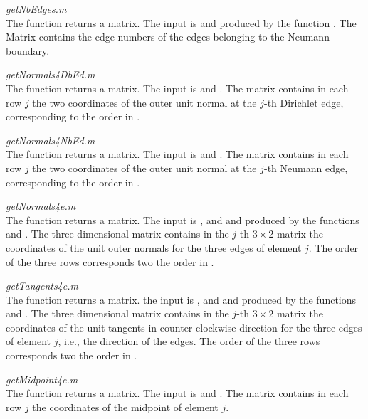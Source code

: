 \noindent\emph{getNbEdges.m}\smallskip\\
The function  returns a \code{[nrNbEdges 1]} matrix. The input is  and  produced by the function . The Matrix contains the edge numbers of the edges belonging to the Neumann boundary.\bigskip


\noindent\emph{getNormals4DbEd.m}\smallskip\\
The function  returns a \code{[nrDbEdges 2]} matrix. The input is  and . The matrix contains in each row $j$ the two coordinates of the outer unit normal at the $j$-th Dirichlet edge, corresponding to the order in .\bigskip


\noindent\emph{getNormals4NbEd.m}\smallskip\\
The function  returns a \code{[nrNbEdges 2]} matrix. The input is  and . The matrix contains in each row $j$ the two coordinates of the outer unit normal at the $j$-th Neumann edge, corresponding to the order in .\bigskip


\noindent\emph{getNormals4e.m}\smallskip\\
The function  returns a \code{[3 2 nrElems]} matrix. The input is ,  and  and  produced by the functions  and . The three dimensional matrix contains in the $j$-th $3 \times 2$ matrix the coordinates of the unit outer normals for the three edges of element $j$. The order of the three rows corresponds two the order in .\bigskip


\noindent\emph{getTangents4e.m}\smallskip\\
The function  returns a \code{[3 2 nrElems]} matrix. the input is ,  and  and  produced by the functions  and . The three dimensional matrix contains in the $j$-th $3 \times 2$ matrix the coordinates of the unit tangents in counter clockwise direction for the three edges of element $j$, i.e., the direction of the edges.
The order of the three rows corresponds two the order in .\bigskip


\noindent\emph{getMidpoint4e.m}\smallskip\\
The function  returns a \code{[nrElems 2]} matrix. The input is  and . The matrix contains in each row $j$ the coordinates of the midpoint of element $j$.\bigskip


